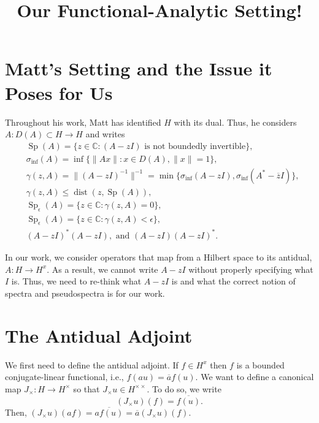 \documentclass[12pt,a4paper]{article}
\title{Our Functional-Analytic Setting!}
\author{}
\date{}
\theoremstyle{boldthm}
\theoremstyle{bolddefn}
\begin{document}
\maketitle


\section{Matt's Setting and the Issue it Poses for Us}

Throughout his work, Matt has identified $H$ with its dual. Thus, he considers $A : D(A) \subset H \rightarrow H$ and writes
\begin{align}
    &\operatorname{Sp}(A) = \{z \in \mathbb{C} : (A-zI) \text{ is not boundedly invertible}\},\\
    &\sigma_{\inf}(A) = \inf \{ \|Ax\| : x \in D(A), \|x\| = 1 \}, \\
    &\gamma(z, A) = \|(A-zI)^{-1} \|^{-1} = \min \{ \sigma_{\inf}(A-zI), \sigma_{\inf}(A^* - \overline{z}I)\},\\
    &\gamma(z, A) \le \operatorname{dist}(z, \operatorname{Sp}(A)),\\
     &\operatorname{Sp}_{\epsilon}(A) = \{z \in \mathbb{C} : \gamma(z, A) = 0\},\\
    &\operatorname{Sp}_{\epsilon}(A) = \{z \in \mathbb{C} : \gamma(z, A) < \epsilon\},\\
    & (A-zI)^*(A-zI), \text{ and } (A-zI)(A-zI)^*.
\end{align}

 In our work, we consider operators that map from a Hilbert space to its antidual, $A: H \rightarrow H^x.$ As a result, we cannot write $A-zI$ without properly specifying what $I$ is. Thus, we need to re-think what $A-zI$ is and what the correct notion of spectra and pseudospectra is for our work. 


\section{The Antidual Adjoint}

We first need to define the antidual adjoint. If $f \in H^x$ then $f$ is a bounded conjugate-linear functional, i.e., $f(au) = \overline{a} f(u).$ We want to define a canonical map $J_{\times} : H \rightarrow H^{\times}$ so that $J_{\times} u \in H^{\times \times}.$ To do so, we write 
\begin{equation}
    (J_{\times} u)(f) = \overline{f(u)}.
\end{equation}
Then, $(J_{\times}u)(af) = \overline{a f(u)} = \overline{a} (J_{\times} u)(f).$
\end{document}
